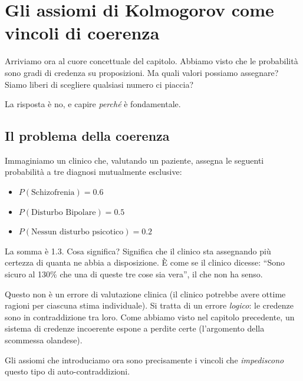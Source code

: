 \documentclass[
  italian,
  letterpaper,
  a4paper,
  11pt,
  open=any]{scrbook}
\providecommand{\tightlist}{%
  \setlength{\itemsep}{0pt}\setlength{\parskip}{0pt}}
\theoremstyle{plain}
\theoremstyle{definition}
\theoremstyle{definition}
\theoremstyle{remark}
\begin{document}
\section{Gli assiomi di Kolmogorov come vincoli di
coerenza}\label{gli-assiomi-di-kolmogorov-come-vincoli-di-coerenza}

Arriviamo ora al cuore concettuale del capitolo. Abbiamo visto che le
probabilità sono gradi di credenza su proposizioni. Ma quali valori
possiamo assegnare? Siamo liberi di scegliere qualsiasi numero ci
piaccia?

La risposta è no, e capire \emph{perché} è fondamentale.

\subsection{Il problema della
coerenza}\label{il-problema-della-coerenza}

Immaginiamo un clinico che, valutando un paziente, assegna le seguenti
probabilità a tre diagnosi mutualmente esclusive:

\begin{itemize}
\tightlist
\item
  \(P(\text{Schizofrenia}) = 0.6\)
\item
  \(P(\text{Disturbo Bipolare}) = 0.5\)
\item
  \(P(\text{Nessun disturbo psicotico}) = 0.2\)
\end{itemize}

La somma è 1.3. Cosa significa? Significa che il clinico sta assegnando
più certezza di quanta ne abbia a disposizione. È come se il clinico
dicesse: ``Sono sicuro al 130\% che una di queste tre cose sia vera'',
il che non ha senso.

Questo non è un errore di valutazione clinica (il clinico potrebbe avere
ottime ragioni per ciascuna stima individuale). Si tratta di un errore
\emph{logico}: le credenze sono in contraddizione tra loro. Come abbiamo
visto nel capitolo precedente, un sistema di credenze incoerente espone
a perdite certe (l'argomento della scommessa olandese).

Gli assiomi che introduciamo ora sono precisamente i vincoli che
\emph{impediscono} questo tipo di auto-contraddizioni.
\end{document}
